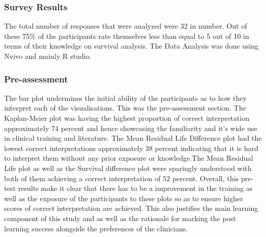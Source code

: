 \documentclass{article}
\begin{document}
\subsubsection{Survey Results}\label{survey-results}

The total number of responses that were analyzed were 32 in number. Out of these 75\% of the participants rate themselves less than equal to 5 out of 10 in terms of their knowledge on survival analysis. The Data Analysis was done using Nvivo and mainly R studio.

\subsubsection{Pre-assessment}\label{pre-assessment}

The bar plot undermines the initial ability of the participants as to how they interpret each of the visualisations. This was the pre-assessment section. The Kaplan-Meier plot was having the highest proportion of correct interpretation approximately 74 percent and hence showcasing the familiarity and it's wide use in clinical training and literature. The Mean Residual Life Difference plot had the lowest correct interpretations approximately 38 percent indicating that it is hard to interpret them without any prior exposure or knowledge.The Mean Residual Life plot as well as the Survival difference plot were sparingly understood with both of them achieving a correct interpretation of 52 percent. Overall, this pre-test results make it clear that there has to be a improvement in the training as well as the exposure of the participants to these plots so as to ensure higher scores of correct interpretation are achieved. This also justifies the main learning component of this study and as well as the rationale for marking the post learning success alongside the preferences of the clinicians.
\end{document}

